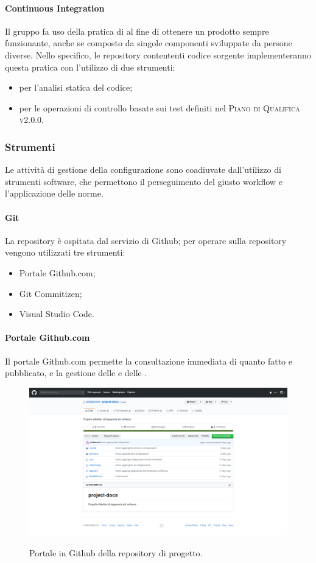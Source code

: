 \documentclass[../norme-di-progetto.tex]{subfiles}
\begin{document}
\paragraph{Continuous Integration}
Il gruppo fa uso della pratica di  al fine di ottenere un prodotto sempre funzionante, anche se composto da singole componenti sviluppate da persone diverse. Nello specifico, le repository contententi codice sorgente implementeranno questa pratica con l'utilizzo di due strumenti:
\begin{itemize}
  \item \textbf{} per l'analisi statica del codice;
  \item \textbf{} per le operazioni di controllo basate sui test definiti nel \textsc{Piano di Qualifica v2.0.0}.
\end{itemize}

\subsubsection{Strumenti}
Le attività di gestione della configurazione sono coadiuvate dall'utilizzo di strumenti software, che permettono il perseguimento del giusto workflow e l'applicazione delle norme.
\paragraph{Git}
La repository è ospitata dal servizio di  Github; per operare sulla repository vengono utilizzati tre strumenti:
\begin{itemize}
  \item Portale Github.com;
  \item Git Commitizen;
  \item Visual Studio Code.
\end{itemize}
\paragraph{Portale Github.com}
Il portale Github.com permette la consultazione immediata di quanto fatto e pubblicato, e la gestione delle  e delle .
\begin{figure}[H]
  \centering
  \includegraphics[width=15cm]{img/github.png}
  \label{fig:github}
  \caption{Portale in Github della repository di progetto.}
\end{figure}
\end{document}
